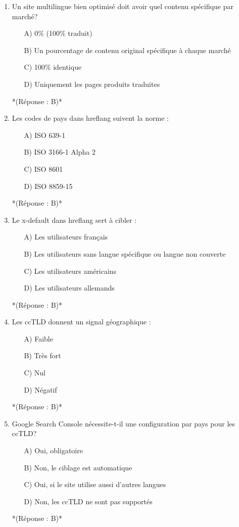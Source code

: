 \documentclass[12pt,a4paper,twoside]{report}
\begin{document}
\begin{enumerate}
\item Un site multilingue bien optimisé doit avoir quel contenu spécifique par marché?
\begin{itemize}
\item[A)] 0\% (100\% traduit)
\item[B)] Un pourcentage de contenu original spécifique à chaque marché
\item[C)] 100\% identique
\item[D)] Uniquement les pages produits traduites
\end{itemize}
*(Réponse : B)*

\item Les codes de pays dans hreflang suivent la norme :
\begin{itemize}
\item[A)] ISO 639-1
\item[B)] ISO 3166-1 Alpha 2
\item[C)] ISO 8601
\item[D)] ISO 8859-15
\end{itemize}
*(Réponse : B)*

\item Le x-default dans hreflang sert à cibler :
\begin{itemize}
\item[A)] Les utilisateurs français
\item[B)] Les utilisateurs sans langue spécifique ou langue non couverte
\item[C)] Les utilisateurs américains
\item[D)] Les utilisateurs allemands
\end{itemize}
*(Réponse : B)*

\item Les ccTLD donnent un signal géographique :
\begin{itemize}
\item[A)] Faible
\item[B)] Très fort
\item[C)] Nul
\item[D)] Négatif
\end{itemize}
*(Réponse : B)*

\item Google Search Console nécessite-t-il une configuration par pays pour les ccTLD?
\begin{itemize}
\item[A)] Oui, obligatoire
\item[B)] Non, le ciblage est automatique
\item[C)] Oui, si le site utilise aussi d'autres langues
\item[D)] Non, les ccTLD ne sont pas supportés
\end{itemize}
*(Réponse : B)*


\end{enumerate}
\end{document}

